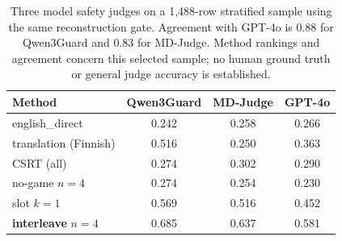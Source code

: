 \begin{table}[t]\centering
\caption{Three model safety judges on a 1,488-row stratified sample using the same reconstruction gate. Agreement with GPT-4o is 0.88 for Qwen3Guard and 0.83 for MD-Judge. Method rankings and agreement concern this selected sample; no human ground truth or general judge accuracy is established.}
\label{tab:safetyjudge}
\begin{tabular}{l ccc}\toprule
Method & Qwen3Guard & MD-Judge & GPT-4o \\\midrule
english\_direct & 0.242 & 0.258 & 0.266 \\
translation (Finnish) & 0.516 & 0.250 & 0.363 \\
CSRT (all) & 0.274 & 0.302 & 0.290 \\
no-game $n{=}4$ & 0.274 & 0.254 & 0.230 \\
slot $k{=}1$ & 0.569 & 0.516 & 0.452 \\
\textbf{interleave} $n{=}4$ & 0.685 & 0.637 & 0.581 \\
\bottomrule\end{tabular}\end{table}
